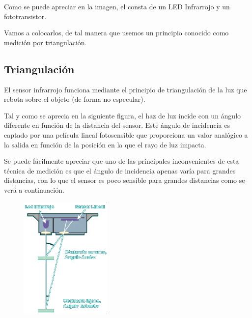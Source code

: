\documentclass[12pt, fleqn]{article}                            %
\theoremstyle{break}                                            %
\begin{document}
            Como se puede apreciar en la imagen, el consta de
            un LED Infrarrojo y un fototransistor.

            Vamos a colocarlos, de tal manera que usemos un principio conocido
            como medición por triangulación.


        \subsection{Triangulación}

            El sensor infrarrojo funciona mediante el principio de triangulación
            de la luz que rebota sobre el objeto (de forma no especular).

            Tal y como se aprecia en la siguiente figura, el haz de luz incide con
            un ángulo diferente en función de la distancia del sensor.
            Este ángulo de incidencia es captado por una película lineal fotosensible
            que proporciona un valor analógico a la salida en función de la posición
            en la que el rayo de luz impacta.


            Se puede fácilmente apreciar que uno de las principales inconvenientes de
            esta técnica de medición es que el ángulo de incidencia apenas varía para
            grandes distancias, con lo que el sensor es poco sensible para grandes
            distancias como se verá a continuación.


            \begin{figure}[h]
                \centering
                \includegraphics[width=0.4\textwidth]{Triangulacion}
            \end{figure}
\end{document}

